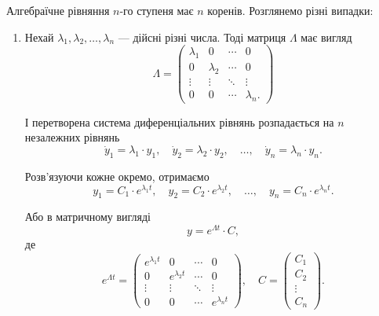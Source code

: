 Алгебраїчне рівняння $n$-го ступеня має $n$ коренів. Розглянемо різні випадки:
\begin{enumerate}
\item Нехай $\lambda_1, \lambda_2, \ldots, \lambda_n$ --- дійсні різні числа. Тоді матриця $\Lambda$ має вигляд
\begin{equation*}
	\Lambda = 
	\begin{pmatrix}
		\lambda_1 & 0 & \cdots & 0 \\
		0 & \lambda_2 & \cdots & 0 \\
		\vdots & \vdots & \ddots & \vdots \\
		0 & 0 & \cdots & \lambda_n.
	\end{pmatrix}
\end{equation*}

І перетворена система диференціальних рівнянь розпадається на $n$ незалежних рівнянь
\begin{equation*}
	\dot y_1 = \lambda_1 \cdot y_1, \quad \dot y_2 = \lambda_2 \cdot y_2, \quad \ldots, \quad \dot y_n = \lambda_n \cdot y_n.
\end{equation*}

Розв’язуючи кожне окремо, отримаємо
\begin{equation*}
	y_1 = C_1 \cdot e^{\lambda_1 t}, \quad y_2 = C_2 \cdot e^{\lambda_2 t}, \quad \ldots, \quad y_n = C_n \cdot e^{\lambda_n t}.
\end{equation*}

Або в матричному вигляді
\begin{equation*}
	y = e^{\Lambda t} \cdot C,
\end{equation*}
де
\begin{equation*}
	e^{\Lambda t} = 
	\begin{pmatrix}
		e^{\lambda_1 t} & 0 & \cdots & 0 \\
		0 & e^{\lambda_2 t} & \cdots & 0 \\
		\vdots & \vdots & \ddots & \vdots \\
		0 & 0 & \cdots & e^{\lambda_n t}
	\end{pmatrix}, \quad
	C = \begin{pmatrix} C_1 \\ C_2 \\ \vdots \\ C_n \end{pmatrix}.
\end{equation*}


\end{enumerate}
